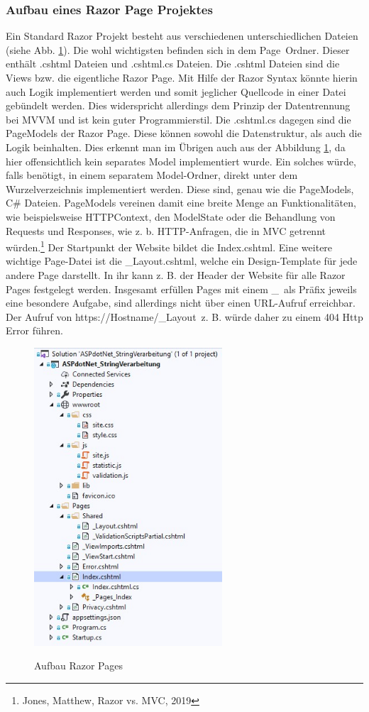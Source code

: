 \documentclass[a4paper,
12pt,
oneside]
{article}
\begin{document}
	\subsubsection{Aufbau eines Razor Page Projektes}
	Ein Standard Razor Projekt besteht aus verschiedenen unterschiedlichen Dateien (siehe Abb. \ref{fig:aufbau}). Die wohl wichtigsten befinden sich in dem \glqq Page\grqq~Ordner. Dieser enthält .cshtml Dateien und .cshtml.cs Dateien. Die .cshtml Dateien sind die Views bzw. die eigentliche Razor Page. Mit Hilfe der Razor Syntax könnte hierin auch Logik implementiert werden und somit jeglicher Quellcode in einer Datei gebündelt werden. Dies widerspricht allerdings dem Prinzip der Datentrennung bei MVVM und ist kein guter Programmierstil. Die .cshtml.cs dagegen sind die PageModels der Razor Page. Diese können sowohl die Datenstruktur, als auch die Logik beinhalten. Dies erkennt man im Übrigen auch aus der Abbildung \ref{fig:aufbau}, da hier offensichtlich kein separates Model implementiert wurde. Ein solches würde, falls benötigt, in einem separatem Model-Ordner, direkt unter dem Wurzelverzeichnis implementiert werden. Diese sind, genau wie die PageModels, C\# Dateien. PageModels vereinen damit eine breite Menge an Funktionalitäten, wie beispielsweise HTTPContext, den ModelState oder die Behandlung von Requests und Responses, wie z. b. HTTP-Anfragen, die in MVC getrennt würden.\footnote{Jones, Matthew, Razor vs. MVC, 2019} Der Startpunkt der Website bildet die Index.cshtml. Eine weitere wichtige Page-Datei ist die \_Layout.cshtml, welche ein Design-Template für jede andere Page darstellt. In ihr kann z. B. der Header der Website für alle Razor Pages festgelegt werden. Insgesamt erfüllen Pages mit einem \glqq\_\grqq~als Präfix jeweils eine besondere Aufgabe, sind allerdings nicht über einen URL-Aufruf erreichbar. Der Aufruf von \glqq https://Hostname/\_Layout\grqq~z. B. würde daher zu einem 404 Http Error führen.
	\begin{figure}
		\centering
		\caption{Aufbau Razor Pages} 
		\includegraphics[width=7cm]{img/aufbau.jpg} \\
		\label{fig:aufbau}
	\end{figure}
\end{document}
